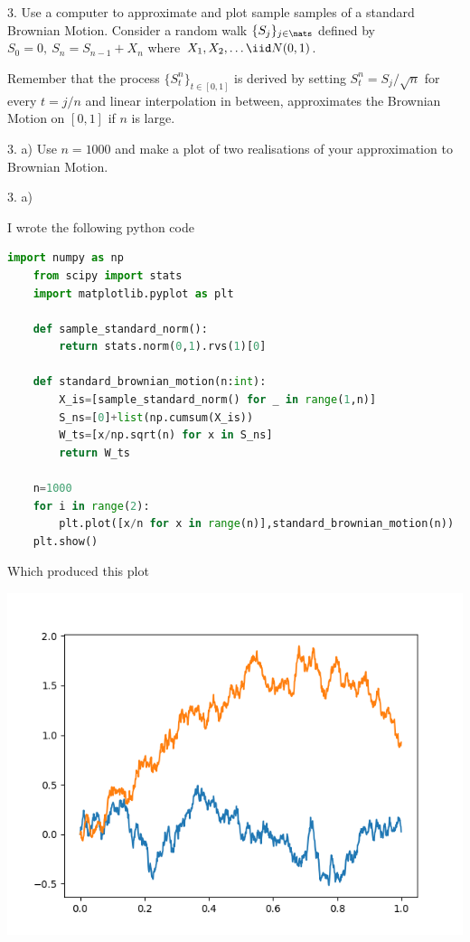 \documentclass[11pt,a4paper]{article}
\begin{document}
\begin{question}{3.}
  Use a computer to approximate and plot sample samples of a standard Brownian Motion. Consider a random walk $\{S_j\}_{j\in\nats}$ defined by $S_0=0,\ S_n=S_{n-1}+X_n$ where $X_1,X_2,\dots\iid N(0,1)$.
  \par Remember that the process $\{S_t^n\}_{t\in[0,1]}$ is derived by setting $S_t^n=S_j/\sqrt{n}$ for every $t=j/n$ and linear interpolation in between, approximates the Brownian Motion on $[0,1]$ if $n$ is large.
\end{question}

\begin{question}{3. a)}
  Use $n=1000$ and make a plot of two realisations of your approximation to Brownian Motion.
\end{question}

\begin{answer}{3. a)}
\end{answer}
  I wrote the following python code
  \begin{lstlisting}[language=Python]
    import numpy as np
    from scipy import stats
    import matplotlib.pyplot as plt

    def sample_standard_norm():
        return stats.norm(0,1).rvs(1)[0]

    def standard_brownian_motion(n:int):
        X_is=[sample_standard_norm() for _ in range(1,n)]
        S_ns=[0]+list(np.cumsum(X_is))
        W_ts=[x/np.sqrt(n) for x in S_ns]
        return W_ts

    n=1000
    for i in range(2):
        plt.plot([x/n for x in range(n)],standard_brownian_motion(n))
    plt.show()
  \end{lstlisting}
  Which produced this plot
  \begin{center}
    \includegraphics[width=.7\textwidth]{img/3_a.png}
  \end{center}
\end{document}
